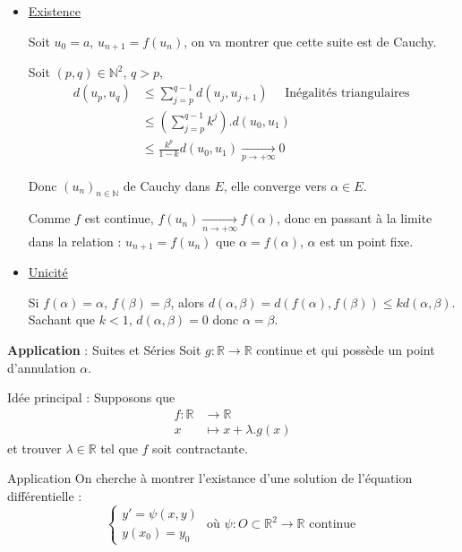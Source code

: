\begin{myproof}{}{}
\begin{itemize}

    \item \underline{Existence}

Soit $u_0 = a$, $u _{n+1} = f(u_n)$, on va montrer que cette suite est de Cauchy.

Soit $(p,q) \in \mathbb{N} ^{2}$, $q>p$, 
\begin{align*}
  d(u_p, u_q) &\le \sum_{j=p}^{q-1} d(u_j, u _{j+1}) \quad \text{ Inégalités triangulaires } \\
              &\le \left( \sum_{j=p}^{q-1} k ^{j}\right) . d(u_0, u_1)\\
              &\le \frac{k ^{p}}{1-k} d(u_0, u_1)  \underset{p \to + \infty}{\longrightarrow} 0
\end{align*}

Donc $(u_n)_{n\in \mathbb{N}}$ de Cauchy dans $E$, elle converge vers $\alpha\in E$. 

Comme $f$ est continue, $f(u_n)  \underset{n \to + \infty}{\longrightarrow} f(\alpha)$, donc en passant à la limite dans la relation : $u _{n+1} = f(u_n)$ que $\alpha = f(\alpha)$, $\alpha$ est un point fixe. 

\item \underline{Unicité}

Si $f(\alpha) = \alpha$, $f(\beta) = \beta$, alors $d(\alpha, \beta) = d(f(\alpha), f(\beta) )\le kd(\alpha, \beta)$. Sachant que $k <1$, $d(\alpha, \beta)=0$ donc $\alpha=\beta$.
\end{itemize}
\end{myproof}

\begin{Prop}{\textbf{Application} : Suites et Séries}{}
Soit $g : \mathbb{R} \to \mathbb{R}$ continue et qui possède un point d'annulation $\alpha$.

Idée principal : Supposons que 
\begin{align*}
  f : \mathbb{R} &\to \mathbb{R} \\
  x &\mapsto x + \lambda.g(x)
\end{align*}
et trouver $\lambda \in \mathbb{R}$ tel que $f$ soit contractante.
\end{Prop}
\begin{Example}{Application}{}
On cherche à montrer l'existance d'une solution de l'équation différentielle :
\[
\begin{cases}
    y' = \psi (x, y) \\
    y(x_0) = y_0
  \end{cases} \text{ où } \psi : O \subset \mathbb{R}^{2} \to \mathbb{R} \text{ continue }
\]
\end{Example}


